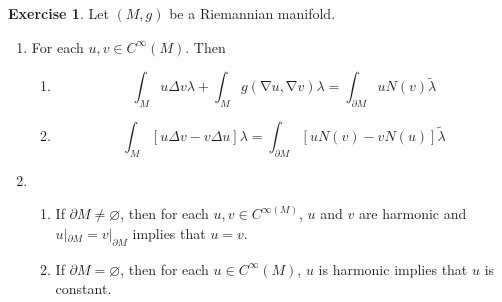 \documentclass{book}
\theoremstyle{definition}
\newtheorem{ex}[definition]{Exercise}
\newcommand{\lam}{\lambda}
\newcommand{\Del}{\Delta}
\DeclareMathOperator{\nab}{\nabla}
\DeclareMathOperator*{\0}{\mbf{0}}
\DeclareMathOperator*{\1}{\mbf{1}}
\newcommand{\p}{\partial}
\begin{document}
\begin{ex}
	Let $(M, g)$ be a Riemannian manifold. 
	\begin{enumerate}
		\item For each $u,v \in C^{\infty}(M)$. Then
		\begin{enumerate}
			\item $$\int_{M} u \Del v \lam + \int_M g(\nab u, \nab v) \lam = \int_{\p M} u N(v) \tilde{\lam}$$ 
			\item $$\int_{M} [u \Del v - v \Del u] \lam = \int_{\p M} [u N(v) - v N(u)] \tilde{\lam} $$
		\end{enumerate}
		\item 
		\begin{enumerate}
			\item If $\p M \neq \varnothing$, then for each $u,v \in C^{\infty(M)}$, $u$ and $v$ are harmonic and $u|_{\p M} = v|_{\p M}$ implies that $u = v$. 
			\item If $\p M = \varnothing$, then for each $u \in C^{\infty}(M)$, $u$ is harmonic implies that  $u$ is constant. 
		\end{enumerate}
	\end{enumerate}
\end{ex}
\end{document}
